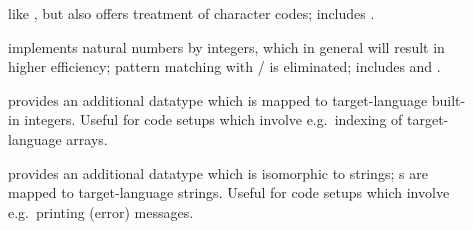 \begin{isabellebody}
\begin{isamarkuptext}
\begin{description}
    \item[\hyperlink{theory.Code-Char-chr}{\mbox{}}] like , but
       also offers treatment of character codes; includes \hyperlink{theory.Code-Char}{\mbox{}}.

    \item[\hyperlink{theory.Efficient-Nat}{\mbox{}}] \label{eff_nat} implements
       natural numbers by integers, which in general will result in
       higher efficiency; pattern matching with  /
        is eliminated; includes \hyperlink{theory.Code-Integer}{\mbox{}}
       and \hyperlink{theory.Code-Numeral}{\mbox{}}.

    \item[\hyperlink{theory.Code-Numeral}{\mbox{}}] provides an additional datatype
        which is mapped to target-language built-in
       integers.  Useful for code setups which involve e.g.~indexing
       of target-language arrays.

    \item[\hyperlink{theory.String}{\mbox{}}] provides an additional datatype  which is isomorphic to strings; s are mapped to target-language strings.  Useful
       for code setups which involve e.g.~printing (error) messages.

  \end{description}


\end{isamarkuptext}
\end{isabellebody}
